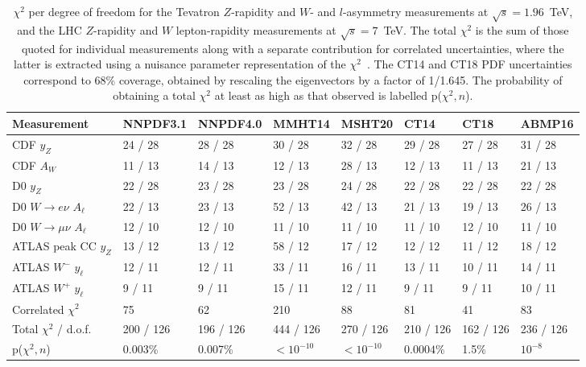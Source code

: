 \begin{table}[!tbp]
  \begin{center}
  \begin{tabular*}{\linewidth}{l @{\extracolsep{\fill}}lllllll}
\hline \hline 
  Measurement                & NNPDF3.1   & NNPDF4.0 & MMHT14   & MSHT20  & CT14      & CT18      & ABMP16  \\
\hline 
  CDF $y_Z$                  & 24 / 28   & 28 / 28   & 30 / 28  & 32 / 28 & 29 / 28   & 27 / 28   & 31 / 28  \\
  CDF $A_W$                  & 11 / 13   & 14 / 13   & 12 / 13  & 28 / 13 & 12 / 13   & 11 / 13   & 21 / 13  \\
  D0  $y_Z$                  & 22 / 28   & 23 / 28   & 23 / 28  & 24 / 28 & 22 / 28   & 22 / 28   & 22 / 28  \\
  D0 $W \to e\nu$ $A_\ell$   & 22 / 13   & 23 / 13   & 52 / 13  & 42 / 13 & 21 / 13   & 19 / 13   & 26 / 13  \\
  D0 $W \to \mu\nu$ $A_\ell$ & 12 / 10   & 12 / 10   & 11 / 10  & 11 / 10 & 11 / 10   & 12 / 10   & 11 / 10  \\
  ATLAS peak CC $y_Z$        & 13 / 12   & 13 / 12   & 58 / 12  & 17 / 12 & 12 / 12   & 11 / 12   & 18 / 12  \\
  ATLAS $W^{-}$ $y_\ell$        & 12 / 11   & 12 / 11   & 33 / 11  & 16 / 11 & 13 / 11   & 10 / 11   & 14 / 11  \\
  ATLAS $W^{+}$ $y_\ell$        &  9 / 11   &  9 / 11   & 15 / 11  & 12 / 11 & 9 / 11    &  9 / 11   & 10 / 11  \\
  Correlated $\chi^2$        & 75        & 62        & 210      & 88      & 81        & 41        & 83       \\
\hline
  Total $\chi^2$ / d.o.f.    & 200 / 126 & 196 / 126 & 444 / 126 & 270 / 126 & 210 / 126 & 162 / 126  & 236 / 126  \\
\hline
  p($\chi^2,n$)        & 0.003\%   & 0.007\%   & $<10^{-10}$  & $<10^{-10}$ & $0.0004\%$ & 1.5\% & $10^{-8}$   \\
\hline \hline 
    \end{tabular*}
    \caption{$\chi^2$ per degree of freedom for the Tevatron $Z$-rapidity and $W$- and $l$-asymmetry
    measurements at $\sqrt{s}=1.96$~TeV, and the LHC $Z$-rapidity and $W$ lepton-rapidity measurements at $\sqrt{s}=7$~TeV.  
    The total $\chi^2$ is the sum of those quoted for individual measurements along with a separate contribution for
    correlated uncertainties, where the latter is extracted using a nuisance parameter representation of the
    $\chi^2$~\cite{alekhin:2015herafitter}.  The CT14 and CT18 PDF uncertainties correspond to 68\% coverage, obtained by
    rescaling the eigenvectors by a factor of 1/1.645.  The probability of obtaining a total $\chi^2$ at least as high
    as that observed is labelled p($\chi^2,n$).
}
    \label{tab:pdfchi2}
  \end{center}
\end{table}

